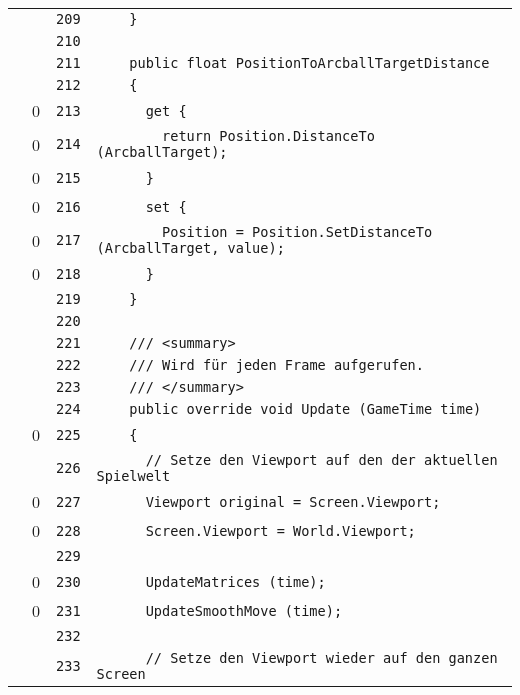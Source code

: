 \documentclass[a4paper,10pt]{article}
\begin{document}
\begin{longtable}[l]{lrrl}
\cellcolor{gray} &  & \verb~209~ & \verb~    }~\\
\cellcolor{gray} &  & \verb~210~ & \verb~~\\
\cellcolor{gray} &  & \verb~211~ & \verb~    public float PositionToArcballTargetDistance~\\
\cellcolor{gray} &  & \verb~212~ & \verb~    {~\\
\cellcolor{red} & 0 & \verb~213~ & \verb~      get {~\\
\cellcolor{red} & 0 & \verb~214~ & \verb~        return Position.DistanceTo (ArcballTarget);~\\
\cellcolor{red} & 0 & \verb~215~ & \verb~      }~\\
\cellcolor{red} & 0 & \verb~216~ & \verb~      set {~\\
\cellcolor{red} & 0 & \verb~217~ & \verb~        Position = Position.SetDistanceTo (ArcballTarget, value);~\\
\cellcolor{red} & 0 & \verb~218~ & \verb~      }~\\
\cellcolor{gray} &  & \verb~219~ & \verb~    }~\\
\cellcolor{gray} &  & \verb~220~ & \verb~~\\
\cellcolor{gray} &  & \verb~221~ & \verb~    /// <summary>~\\
\cellcolor{gray} &  & \verb~222~ & \verb~    /// Wird für jeden Frame aufgerufen.~\\
\cellcolor{gray} &  & \verb~223~ & \verb~    /// </summary>~\\
\cellcolor{gray} &  & \verb~224~ & \verb~    public override void Update (GameTime time)~\\
\cellcolor{red} & 0 & \verb~225~ & \verb~    {~\\
\cellcolor{gray} &  & \verb~226~ & \verb~      // Setze den Viewport auf den der aktuellen Spielwelt~\\
\cellcolor{red} & 0 & \verb~227~ & \verb~      Viewport original = Screen.Viewport;~\\
\cellcolor{red} & 0 & \verb~228~ & \verb~      Screen.Viewport = World.Viewport;~\\
\cellcolor{gray} &  & \verb~229~ & \verb~~\\
\cellcolor{red} & 0 & \verb~230~ & \verb~      UpdateMatrices (time);~\\
\cellcolor{red} & 0 & \verb~231~ & \verb~      UpdateSmoothMove (time);~\\
\cellcolor{gray} &  & \verb~232~ & \verb~~\\
\cellcolor{gray} &  & \verb~233~ & \verb~      // Setze den Viewport wieder auf den ganzen Screen~\\

\end{longtable}
\end{document}
